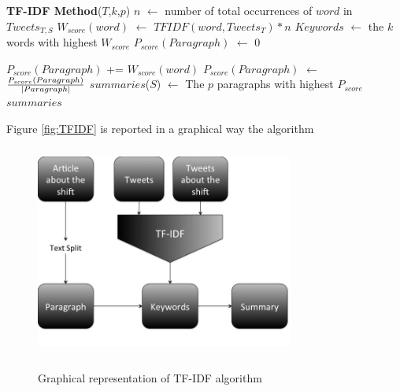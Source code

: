 \begin{algorithmic}
\STATE \textbf{TF-IDF Method}($T$,$k$,$p$)
\STATE
{}
		\STATE $n$ $\leftarrow$ number of total occurrences of $word$ in $Tweets_{T,S}$
		\STATE $W_{score}(word)$ $\leftarrow$ $TFIDF(word,Tweets_T) * n$
	\ENDFOR
	\STATE
	\STATE $Keywords$ $\leftarrow$ the $k$ words with highest $W_{score}$
	\STATE
			\STATE $P_{score}(Paragraph)$ $\leftarrow$ $0$

					\STATE $P_{score}(Paragraph)$ += $W_{score}(word)$
				\ENDIF
			\ENDFOR
			\STATE $P_{score}(Paragraph)$ $\leftarrow$ ${P_{score}(Paragraph) \over |Paragraph|}$
		\ENDFOR
	\ENDFOR
	\STATE
	\STATE $summaries$($S$) $\leftarrow$ The $p$ paragraphs with highest $P_{score}$
\ENDFOR
\STATE
\RETURN $summaries$

Figure \ref{fig:TFIDF} is reported in a graphical way the algorithm 

\begin{figure}[htbp]
	\centering
			{\includegraphics[width=8.5cm,height=7cm]{image/TF-IDF.jpg}}	
		\caption[TFIDF]{Graphical representation of TF-IDF algorithm}
	\label{fig:LSI}
\end{figure} 

\end{algorithmic}